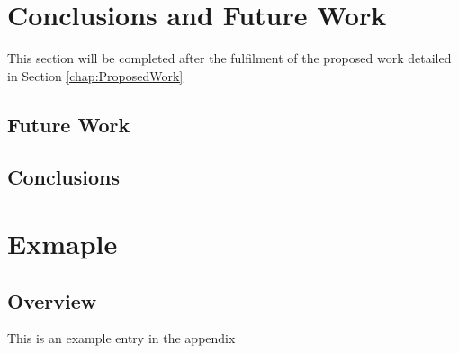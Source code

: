 \documentclass[a4paper,twoside,phd]{BYUPhys}
\begin{document}
\chapter{Conclusions and Future Work}
\label{chap:Conclusions}
This section will be completed after the fulfilment of the proposed work detailed in Section \ref{chap:ProposedWork}

\section{Future Work}
\label{FutureWork}

\section{Conclusions}
\label{sec:ConclusionsConclusions}



\clearemptydoublepage


\appendix
\chapter{Exmaple}
\section{Overview}
This is an example entry in the appendix



%

%

%
\end{document}
